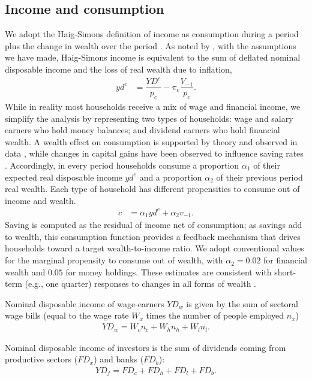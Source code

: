 \documentclass[authoryear]{article}
\begin{document}
\subsection{Income and consumption}
\label{sec:income}

We adopt the Haig-Simons definition of income as consumption during a period plus the change in wealth over the period \citep[p. 50]{simons_personal_1938}. As noted by \citet[pp. 140, 293-4]{Godley:2007}, with the assumptions we have made, Haig-Simons income is equivalent to the sum of deflated nominal disposable income and the loss of real wealth due to inflation,
\begin{align}
yd^e&=\dfrac{YD^e}{p_c}-\pi_c \dfrac{V_{-1}}{p_c}.
\end{align}
While in reality most households receive a mix of wage and financial income, we simplify the analysis by representing two types of households: wage and salary earners who hold money balances; and dividend earners who hold financial wealth. A wealth effect on consumption is supported by theory and observed in data \citet{poterba_stock_2000}, while changes in capital gains have been observed to influence saving rates \citet{juster_decline_2006}. Accordingly, in every period households consume a proportion $\alpha_1$ of their expected real disposable income $yd^e$ and a proportion $\alpha_2$ of their previous period real wealth. Each type of household has different propensities to consume out of income and wealth.
\begin{align}
c&=\alpha_1 yd^e + \alpha_2 v_{-1}.
\end{align}
Saving is computed as the residual of income net of consumption; as savings add to wealth, this consumption function provides a feedback mechanism that drives households toward a target wealth-to-income ratio. We adopt conventional values for the marginal propensity to consume out of wealth, with $\alpha_2 = 0.02$ for financial wealth and $0.05$ for money holdings. These estimates are consistent with short-term (e.g., one quarter) responses to changes in all forms of wealth \citet{poterba_stock_2000}.

Nominal disposable income of wage-earners $YD_w$ is given by the sum of sectoral wage bills (equal to the wage rate $W_x$ times the number of people employed $n_x$)
\begin{align}
YD_w=W_c n_c+ W_h n_h+W_l n_l.
\end{align}

Nominal disposable income of investors is the sum of dividends coming from productive sectors ($FD_x$) and banks ($FD_b$):
\begin{align}
YD_f=FD_c+FD_h+FD_l+FD_b.
\end{align}
\end{document}

